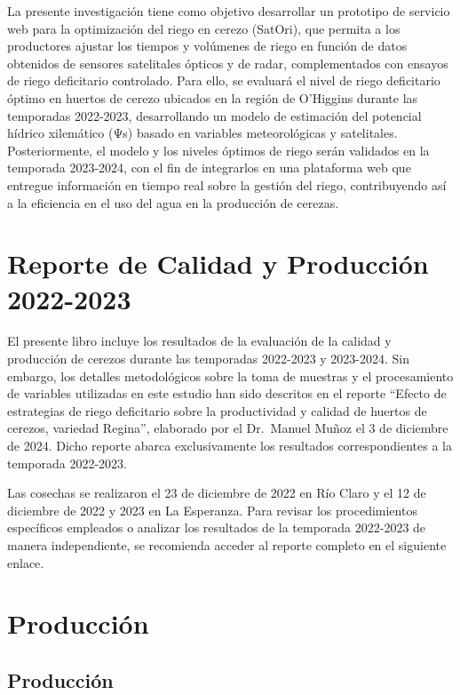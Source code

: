 \documentclass[
  letterpaper,
  DIV=11,
  numbers=noendperiod]{scrreprt}
\begin{document}
La presente investigación tiene como objetivo desarrollar un prototipo
de servicio web para la optimización del riego en cerezo (SatOri), que
permita a los productores ajustar los tiempos y volúmenes de riego en
función de datos obtenidos de sensores satelitales ópticos y de radar,
complementados con ensayos de riego deficitario controlado. Para ello,
se evaluará el nivel de riego deficitario óptimo en huertos de cerezo
ubicados en la región de O'Higgins durante las temporadas 2022-2023,
desarrollando un modelo de estimación del potencial hídrico xilemático
(Ψs) basado en variables meteorológicas y satelitales. Posteriormente,
el modelo y los niveles óptimos de riego serán validados en la temporada
2023-2024, con el fin de integrarlos en una plataforma web que entregue
información en tiempo real sobre la gestión del riego, contribuyendo así
a la eficiencia en el uso del agua en la producción de cerezas.

\part{Reporte de Calidad y Producción 2022-2023}

El presente libro incluye los resultados de la evaluación de la calidad
y producción de cerezos durante las temporadas 2022-2023 y 2023-2024.
Sin embargo, los detalles metodológicos sobre la toma de muestras y el
procesamiento de variables utilizadas en este estudio han sido descritos
en el reporte ``Efecto de estrategias de riego deficitario sobre la
productividad y calidad de huertos de cerezos, variedad Regina'',
elaborado por el Dr.~Manuel Muñoz el 3 de diciembre de 2024. Dicho
reporte abarca exclusivamente los resultados correspondientes a la
temporada 2022-2023.

Las cosechas se realizaron el 23 de diciembre de 2022 en Río Claro y el
12 de diciembre de 2022 y 2023 en La Esperanza. Para revisar los
procedimientos específicos empleados o analizar los resultados de la
temporada 2022-2023 de manera independiente, se recomienda acceder al
reporte completo en el siguiente enlace.

\part{Producción}

\chapter{Producción}\label{producciuxf3n-1}
\end{document}
